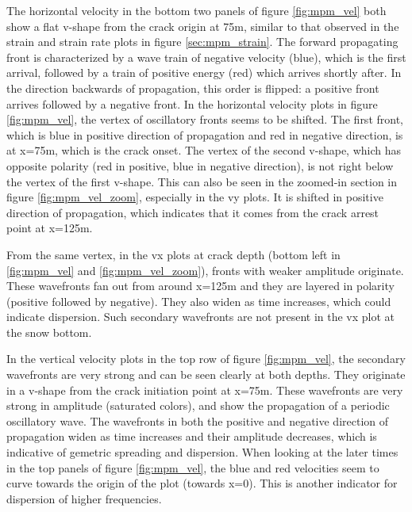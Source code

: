 The horizontal velocity in the bottom two panels of figure \ref{fig:mpm_vel} both show a flat v-shape from the crack origin at 75m, similar to that observed in the strain and strain rate plots in figure \ref{sec:mpm_strain}. The forward propagating front is characterized by a wave train of negative velocity (blue), which is the first arrival, followed by a train of positive energy (red) which arrives shortly after. In the direction backwards of propagation, this order is flipped: a positive front arrives followed by a negative front. In the horizontal velocity plots in figure \ref{fig:mpm_vel}, the vertex of oscillatory fronts seems to be shifted. The first front, which is blue in positive direction of propagation and red in negative direction, is at x=75m, which is the crack onset. The vertex of the second v-shape, which has opposite polarity (red in positive, blue in negative direction), is not right below the vertex of the first v-shape. This can also be seen in the zoomed-in section in figure \ref{fig:mpm_vel_zoom}, especially in the vy plots. It is shifted in positive direction of propagation, which indicates that it comes from the crack arrest point at x=125m. \par 

From the same vertex, in the vx plots at crack depth (bottom left in \ref{fig:mpm_vel} and \ref{fig:mpm_vel_zoom}), fronts with weaker amplitude originate. These wavefronts fan out from around x=125m and they are layered in polarity (positive followed by negative). They also widen as time increases, which could indicate dispersion. Such secondary wavefronts are not present in the vx plot at the snow bottom. \par 

In the vertical velocity plots in the top row of figure \ref{fig:mpm_vel}, the secondary wavefronts are very strong and can be seen clearly at both depths. They originate in a v-shape from the crack initiation point at x=75m. These wavefronts are very strong in amplitude (saturated colors), and show the propagation of a periodic oscillatory wave. The wavefronts in both the positive and negative direction of propagation widen as time increases and their amplitude decreases, which is indicative of gemetric spreading and dispersion. When looking at the later times in the top panels of figure \ref{fig:mpm_vel}, the blue and red velocities seem to curve towards the origin of the plot (towards x=0). This is another indicator for dispersion of higher frequencies. \par

